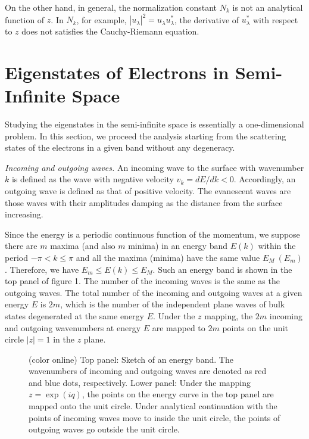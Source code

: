 \documentclass[aps,pra,amsmath,twocolumn,showpacs,bibnotes,10pt]{revtex4-1}
\begin{document}
On the other hand, in general, the normalization constant $N_k$ is not an analytical function of $z$. In $N_k$,  for example, $|u_{\lambda}|^2 = u_{\lambda}u_{\lambda}^{\ast}$, the derivative of $u_{\lambda}^{\ast}$ with respect to $z$ does not satisfies the Cauchy-Riemann equation.

\section{Eigenstates of Electrons in Semi-Infinite Space}

Studying the eigenstates in the semi-infinite space is essentially a one-dimensional problem. In this section, we proceed the analysis starting from the scattering states of the electrons in a given band without any degeneracy.   

{\it Incoming and outgoing waves.} An incoming wave to the surface with wavenumber $k$ is defined as the wave with negative velocity $v_k = dE/dk < 0$. Accordingly, an outgoing wave is defined as that of positive velocity. The evanescent waves are those waves with their amplitudes damping as the distance from the surface increasing. 

Since the energy is a periodic continuous function of the momentum, we suppose there are $m$ maxima (and also $m$ minima) in an energy band $E(k)$ within the period $-\pi < k \le\pi$ and all the maxima (minima) have the same value $E_M~ (E_m)$. Therefore, we have $E_m \le E(k) \le E_M$. Such an energy band is shown in the top panel of figure 1. The number of the incoming waves is the same as the outgoing waves. The total number of the incoming and outgoing waves at a given energy $E$ is $2m$, which is the number of the independent plane waves of bulk states degenerated at the same energy $E$. Under the $z$ mapping, the $2m$ incoming and outgoing wavenumbers at energy $E$ are mapped to $2m$ points on the unit circle $|z| = 1$ in the $z$ plane.   

\begin{figure}[t]
\centerline{}
\caption{(color online) Top panel: Sketch of an energy band. The wavenumbers of incoming and outgoing waves are denoted as red and blue dots, respectively. Lower panel: Under the mapping $z = \exp(iq)$, the points on the energy curve in the top panel are mapped onto the unit circle. Under analytical continuation with the points of incoming waves move to inside the unit circle, the points of outgoing waves go outside the unit circle.} 
\end{figure}
\end{document}
